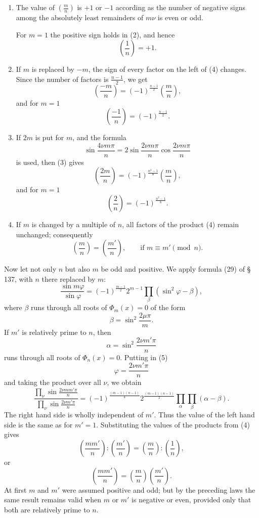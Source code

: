 \documentclass[11pt]{article}
\begin{document}
\begin{enumerate}[label=\arabic*.,leftmargin=2em]
\item The value of $\left(\frac mn\right)$ is $+1$ or $-1$ according as the number of negative signs among the absolutely least remainders of $m\nu$ is even or odd.

For $m=1$ the positive sign holds in (2), and hence
\[
        \left(\frac 1n\right)=+1.
\]

\item If $m$ is replaced by $-m$, the sign of every factor on the left of (4) changes. Since the number of factors is $\frac{n-1}{2}$, we get
\[
\tag{3'}
        \left(\frac{-m}{n}\right)=(-1)^{\frac{n-1}{2}}\left(\frac mn\right),
\]
and for $m=1$
\[
\tag{4'}
        \left(\frac{-1}{n}\right)=(-1)^{\frac{n-1}{2}}.
\]

\item If $2m$ is put for $m$, and the formula
\[
        \sin\frac{4\nu m\pi}{n}
        =2\sin\frac{2\nu m\pi}{n}\cos\frac{2\nu m\pi}{n}
\]
is used, then (3) gives
\[
\tag{5}
        \left(\frac{2m}{n}\right)=(-1)^{\frac{n^2-1}{8}}\left(\frac mn\right),
\]
and for $m=1$
\[
\tag{6}
        \left(\frac 2n\right)=(-1)^{\frac{n^2-1}{8}}.
\]

\item If $m$ is changed by a multiple of $n$, all factors of the product (4) remain unchanged; consequently
\[
\tag{7}
        \left(\frac mn\right)=\left(\frac {m'}n\right),
        \qquad\text{if }m\equiv m'\pmod n.
\]
\end{enumerate}

Now let not only $n$ but also $m$ be odd and positive. We apply formula (29) of §\,137, with $n$ there replaced by $m$:
\[
\tag{5}
\frac{\sin m\varphi}{\sin\varphi}
=(-1)^{\frac{m-1}{2}}2^{m-1}\prod_\beta(\sin^2\varphi-\beta),
\]
where $\beta$ runs through all roots of $\Phi_m(x)=0$ of the form
\[
\tag{6}
        \beta=\sin^2\frac{2\mu\pi}{m}.
\]
If $m'$ is relatively prime to $n$, then
\[
\tag{7}
        \alpha=\sin^2\frac{2\nu m'\pi}{n}
\]
runs through all roots of $\Phi_n(x)=0$. Putting in (5)
\[
\tag{8}
        \varphi=\frac{2\nu m'\pi}{n}
\]
and taking the product over all $\nu$, we obtain
\[
\tag{9}
\frac{\prod_\nu \sin\frac{2\nu m m'\pi}{n}}
     {\prod_\nu \sin\frac{2\nu m'\pi}{n}}
=(-1)^{\frac{(m-1)(n-1)}4}
2^{\frac{(m-1)(n-1)}2}\prod_\alpha\prod_\beta(\alpha-\beta).
\]
The right hand side is wholly independent of $m'$. Thus the value of the left hand side is the same as for $m'=1$. Substituting the values of the products from (4) gives
\[
        \left(\frac{mm'}n\right):\left(\frac{m'}n\right)
        =
        \left(\frac mn\right):\left(\frac 1n\right),
\]
or
\[
        \left(\frac{mm'}n\right)=
        \left(\frac mn\right)\left(\frac{m'}n\right).
\]
At first $m$ and $m'$ were assumed positive and odd; but by the preceding laws the same result remains valid when $m$ or $m'$ is negative or even, provided only that both are relatively prime to $n$.
\end{document}
